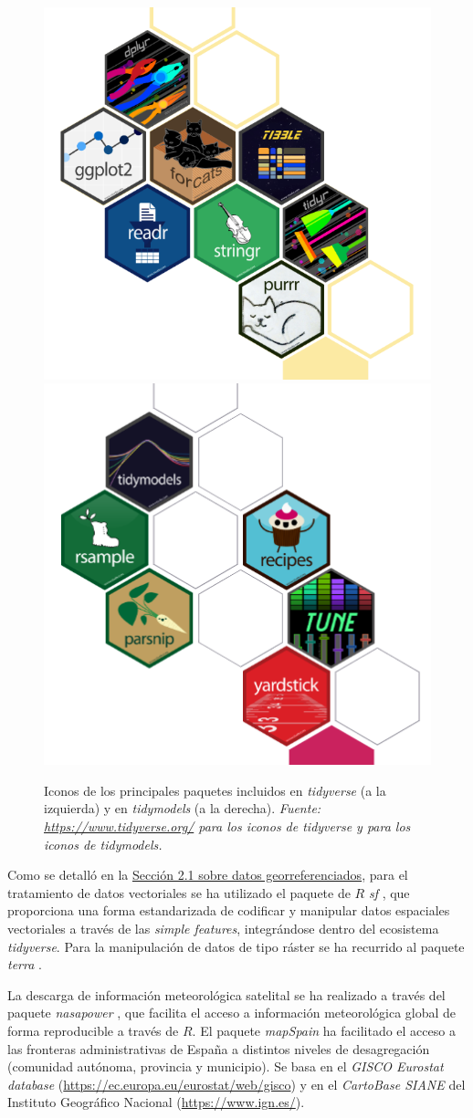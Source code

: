 \documentclass[12pt,a4paper,]{book}
\numberwithin{dummy}{section}
\theoremstyle{ocrenumbox}
\theoremstyle{blacknumex}
\theoremstyle{blacknumbox}
\theoremstyle{ocrenum}
\theoremstyle{ocrenum}
\begin{document}
\begin{figure}[h]
  \includegraphics[width=.5\textwidth]{graficos/tidyverse_icons.png}\hfill
  \includegraphics[width=.5\textwidth]{graficos/tidymodels_icons.png}\hfill
  \caption[Iconos de los principales paquetes incluidos en \textit{tidyverse} y en \textit{tidymodels}]{Iconos de los principales paquetes incluidos en \textit{tidyverse} (a la izquierda) y en \textit{tidymodels} (a la derecha). \it Fuente: \url{https://www.tidyverse.org/} para los iconos de tidyverse y \citet{tidymodelspackage} para los iconos de tidymodels.}
\end{figure}

Como se detalló en la
\protect\hyperlink{datos-georreferenciados}{Sección 2.1 sobre datos
georreferenciados}, para el tratamiento de datos vectoriales se ha
utilizado el paquete de \(R\) \emph{sf} \citep{sfpackage}, que
proporciona una forma estandarizada de codificar y manipular datos
espaciales vectoriales a través de las \emph{simple features},
integrándose dentro del ecosistema \emph{tidyverse}. Para la
manipulación de datos de tipo ráster se ha recurrido al paquete
\emph{terra} \citep{terrapackage}.

La descarga de información meteorológica satelital se ha realizado a
través del paquete \emph{nasapower} \citep{nasapower}, que facilita el
acceso a información meteorológica global de forma reproducible a través
de \(R\). El paquete \emph{mapSpain}\citep{R-mapspain} ha facilitado el
acceso a las fronteras administrativas de España a distintos niveles de
desagregación (comunidad autónoma, provincia y municipio). Se basa en el
\emph{GISCO Eurostat database}
(\url{https://ec.europa.eu/eurostat/web/gisco}) y en el \emph{CartoBase
SIANE} del Instituto Geográfico Nacional (\url{https://www.ign.es/}).




%
\end{document}
